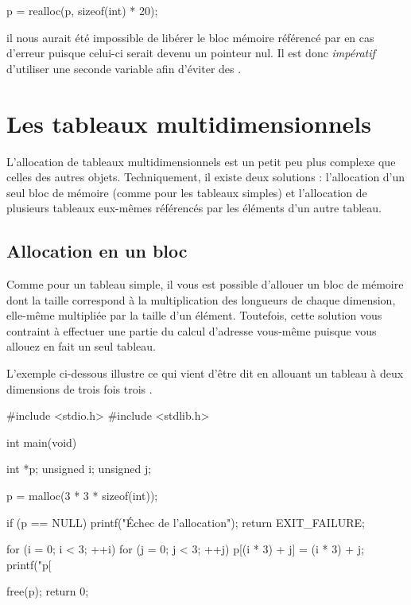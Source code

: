 \begin{C}
p = realloc(p, sizeof(int) * 20);
\end{C}

il nous aurait été impossible de libérer le bloc mémoire référencé par
 en cas d'erreur puisque celui-ci serait devenu un pointeur
nul. Il est donc \emph{impératif} d'utiliser une seconde variable afin
d'éviter des .

\section{Les tableaux multidimensionnels}
\label{les-tableaux-multidimensionnels-2}

L'allocation de tableaux multidimensionnels est un petit peu
plus complexe que celles des autres objets. Techniquement, il existe
deux solutions : l'allocation d'un seul bloc de mémoire (comme pour les
tableaux simples) et l'allocation de plusieurs tableaux eux-mêmes
référencés par les éléments d'un autre tableau.

\subsection{Allocation en un bloc}
\label{allocation-en-un-bloc}

Comme pour un tableau simple, il vous est possible d'allouer un bloc de
mémoire dont la taille correspond à la multiplication des longueurs de
chaque dimension, elle-même multipliée par la taille d'un élément.
Toutefois, cette solution vous contraint à effectuer une partie du
calcul d'adresse vous-même puisque vous allouez en fait un seul tableau.

L'exemple ci-dessous illustre ce qui vient d'être dit en allouant un
tableau à deux dimensions de trois fois trois .

\begin{C}
#include <stdio.h>
#include <stdlib.h>


int main(void)
{
    int *p;
    unsigned i;
    unsigned j;

    p = malloc(3 * 3 * sizeof(int));

    if (p == NULL)
    {
        printf("Échec de l'allocation\n");
        return EXIT_FAILURE;
    }

    for (i = 0; i < 3; ++i)
        for (j = 0; j < 3; ++j)
        {
            p[(i * 3) + j] = (i * 3) + j;
            printf("p[%
        }

    free(p);
    return 0;
}
\end{C}

